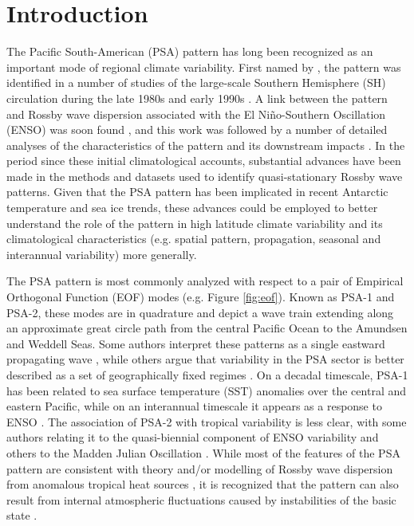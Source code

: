 \section{Introduction}

The Pacific South-American (PSA) pattern has long been recognized as an important mode of regional climate variability. First named by \citet{Mo1987}, the pattern was identified in a number of studies of the large-scale Southern Hemisphere (SH) circulation during the late 1980s and early 1990s \citep[e.g.][]{Kidson1988,Ghil1991,Lau1994}. A link between the pattern and Rossby wave dispersion associated with the El Ni\~{n}o-Southern Oscillation (ENSO) was soon found \citep[e.g.][]{Karoly1989}, and this work was followed by a number of detailed analyses of the characteristics of the pattern and its downstream impacts \citep[e.g.][]{Mo1998,Mo2000,Mo2001}. In the period since these initial climatological accounts, substantial advances have been made in the methods and datasets used to identify quasi-stationary Rossby wave patterns. Given that the PSA pattern has been implicated in recent Antarctic temperature and sea ice trends, these advances could be employed to better understand the role of the pattern in high latitude climate variability and its climatological characteristics (e.g. spatial pattern, propagation, seasonal and interannual variability) more generally.

The PSA pattern is most commonly analyzed with respect to a pair of Empirical Orthogonal Function (EOF) modes (e.g. Figure \ref{fig:eof}). Known as PSA-1 and PSA-2, these modes are in quadrature and depict a wave train extending along an approximate great circle path from the central Pacific Ocean to the Amundsen and Weddell Seas. Some authors interpret these patterns as a single eastward propagating wave \citep{Mo1998}, while others argue that variability in the PSA sector is better described as a set of geographically fixed regimes \citep{Robertson2003}. On a decadal timescale, PSA-1 has been related to sea surface temperature (SST) anomalies over the central and eastern Pacific, while on an interannual timescale it appears as a response to ENSO \citep{Mo2001}. The association of PSA-2 with tropical variability is less clear, with some authors relating it to the quasi-biennial component of ENSO variability \citep{Mo2000} and others to the Madden Julian Oscillation \citep{Renwick1999}. While most of the features of the PSA pattern are consistent with theory and/or modelling of Rossby wave dispersion from anomalous tropical heat sources \citep[e.g.][]{Liu2007,Li2015}, it is recognized that the pattern can also result from internal atmospheric fluctuations caused by instabilities of the basic state \citep[and that both mechanisms likely act in concert; e.g.][]{Grimm2009}.

